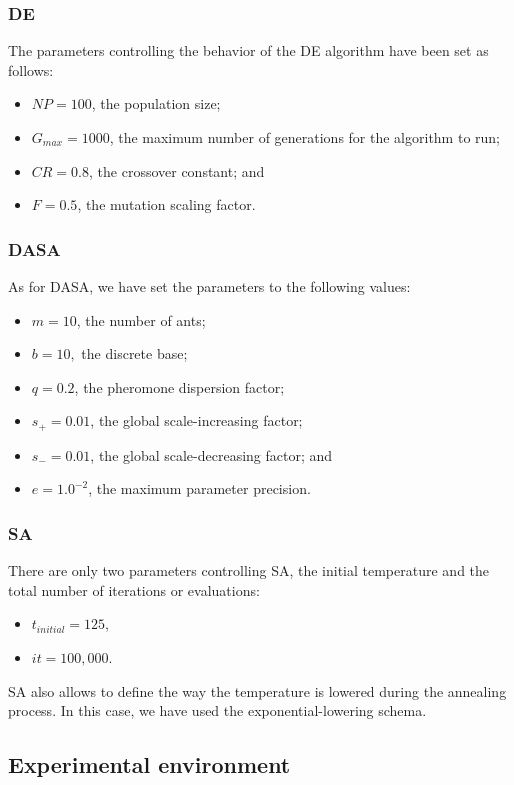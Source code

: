 \subsubsection{DE}

The parameters controlling the behavior of the DE algorithm have been
set as follows:
\begin{itemize}
\item $NP=100$, the population size;
\item $G_{max}=1000$, the maximum number of generations for the algorithm
to run;
\item $CR=0.8$, the crossover constant; and
\item $F=0.5$, the mutation scaling factor.
\end{itemize}

\subsubsection{DASA}

As for DASA, we have set the parameters to the following values:
\begin{itemize}
\item $m=10$, the number of ants;
\item $b=10,$ the discrete base;
\item $q=0.2$, the pheromone dispersion factor;
\item $s_{+}=0.01$, the global scale-increasing factor;
\item $s_{-}=0.01$, the global scale-decreasing factor; and 
\item $e=1.0^{-2}$, the maximum parameter precision.
\end{itemize}

\subsubsection{SA}

There are only two parameters controlling SA, the initial temperature
and the total number of iterations or evaluations:
\begin{itemize}
\item $t_{initial}=125$,
\item $it=100,000$.
\end{itemize}
SA also allows to define the way the temperature is lowered during
the annealing process. In this case, we have used the exponential-lowering
schema.


\subsection{Experimental environment}

